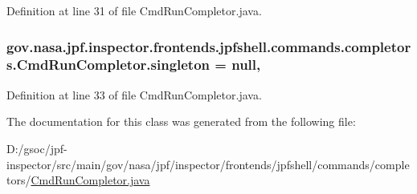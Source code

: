 Definition at line 31 of file Cmd\+Run\+Completor.\+java.

\subsubsection[{\texorpdfstring{singleton}{singleton}}]{ gov.\+nasa.\+jpf.\+inspector.\+frontends.\+jpfshell.\+commands.\+completors.\+Cmd\+Run\+Completor.\+singleton = null\hspace{0.3cm}{\ttfamily [static]}, {\ttfamily [private]}}\hypertarget{classgov_1_1nasa_1_1jpf_1_1inspector_1_1frontends_1_1jpfshell_1_1commands_1_1completors_1_1_cmd_run_completor_ab9dfa61331cad662287fb66da080067f}{}\label{classgov_1_1nasa_1_1jpf_1_1inspector_1_1frontends_1_1jpfshell_1_1commands_1_1completors_1_1_cmd_run_completor_ab9dfa61331cad662287fb66da080067f}


Definition at line 33 of file Cmd\+Run\+Completor.\+java.



The documentation for this class was generated from the following file\+:\begin{DoxyCompactItemize}
\item 
D\+:/gsoc/jpf-\/inspector/src/main/gov/nasa/jpf/inspector/frontends/jpfshell/commands/completors/\hyperlink{_cmd_run_completor_8java}{Cmd\+Run\+Completor.\+java}\end{DoxyCompactItemize}
